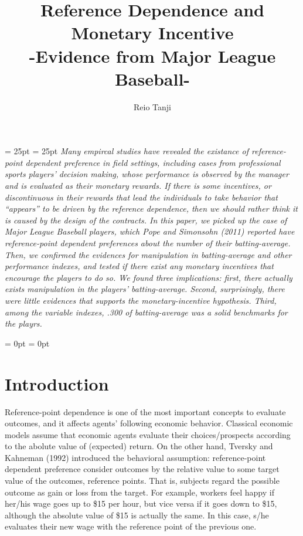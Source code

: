 \documentclass[dvipdfmx, 12pt]{article}
\begin{document}
\title{Reference Dependence and Monetary Incentive \\
-Evidence from Major League Baseball-}
\author{Reio Tanji}
\date{}
\maketitle

\leftskip = 25pt
\rightskip = 25pt
  \small
  \textit{
  Many empircal studies have revealed the existance of reference-point dependent preference in field settings, including cases from professional sports players' decision making, whose performance is observed by the manager and is evaluated as their monetary rewards. If there is some incentives, or discontinuous in their rewards that lead the individuals to take behavior that ``appears'' to be driven by the reference dependence, then we should rather think it is caused by the design of the contracts. In this paper, we picked up the case of Major League Baseball players, which Pope and Simonsohn (2011) reported have reference-point dependent preferences about the number of their batting-average. Then, we confirmed the evidences for manipulation in batting-average and other performance indexes, and tested if there exist any monetary incentives that encourage the players to do so. We found three implications: first, there actually exists manipulation in the players' batting-average. Second, surprisingly, there were little evidences that supports the monetary-incentive hypothesis. Third, among the variable indexes, .300 of batting-average was a solid benchmarks for the playrs.
  }

\leftskip = 0pt
\rightskip = 0pt
\normalsize


\section{Introduction}

Reference-point dependence is one of the most important concepts to evaluate outcomes, and it affects agents' following economic behavior. Classical economic models assume that economic agents evaluate their choices/prospects according to the abolute value of (expected) return. On the other hand, Tversky and Kahneman (1992) introduced the behavioral assumption: reference-point dependent preference consider outcomes by the relative value to some target value of the outcomes, reference points. That is, subjects regard the possible outcome as gain or loss from the target. For example, workers feel happy if her/his wage goes up to \$15 per hour, but vice versa if it goes down to \$15, although the absolute value of \$15 is actually the same. In this case, s/he evaluates their new wage with the reference point of the previous one.
\end{document}

